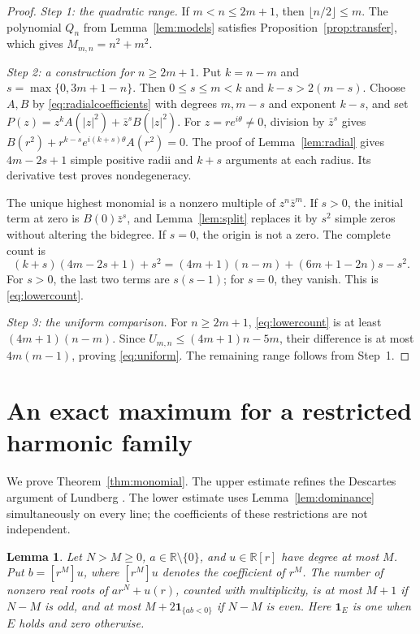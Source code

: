 \documentclass[a4paper]{amsart}
\newtheorem{lem}[thm]{Lemma}
\theoremstyle{remark}
\newcommand{\R}{\mathbb R}
\begin{document}
\begin{proof}
\emph{Step 1: the quadratic range.}
If \(m<n\le2m+1\), then \(\lfloor n/2\rfloor\le m\).
The polynomial \(Q_n\) from Lemma~\ref{lem:models}
satisfies Proposition~\ref{prop:transfer}, which gives
\(M_{m,n}=n^2+m^2\).

\emph{Step 2: a construction for \(n\ge2m+1\).}
Put \(k=n-m\) and \(s=\max\{0,3m+1-n\}\).
Then \(0\le s\le m<k\) and \(k-s>2(m-s)\).
Choose \(A,B\) by \eqref{eq:radialcoefficients} with
degrees \(m,m-s\) and exponent \(k-s\), and set
\(P(z)=z^kA(|z|^2)+\bar z^sB(|z|^2)\).
For \(z=re^{i\theta}\ne0\), division by \(\bar z^s\)
gives
\(B(r^2)+r^{k-s}e^{i(k+s)\theta}A(r^2)=0\).
The proof of Lemma~\ref{lem:radial} gives
\(4m-2s+1\) simple positive radii and \(k+s\)
arguments at each radius. Its derivative test proves
nondegeneracy.

The unique highest monomial is a nonzero multiple of
\(z^n\bar z^m\). If \(s>0\), the initial term at zero
is \(B(0)\bar z^s\), and Lemma~\ref{lem:split}
replaces it by \(s^2\) simple zeros without altering
the bidegree. If \(s=0\), the origin is not a zero.
The complete count is
\[
 (k+s)(4m-2s+1)+s^2
 =(4m+1)(n-m)+(6m+1-2n)s-s^2.
\]
For \(s>0\), the last two terms are \(s(s-1)\);
for \(s=0\), they vanish. This is \eqref{eq:lowercount}.

\emph{Step 3: the uniform comparison.}
For \(n\ge2m+1\), \eqref{eq:lowercount} is at least
\((4m+1)(n-m)\). Since
\(U_{m,n}\le(4m+1)n-5m\), their difference is
at most \(4m(m-1)\), proving \eqref{eq:uniform}.
The remaining range follows from Step~1.
\end{proof}

\section{An exact maximum for a restricted harmonic family}\label{sec:monomial}

We prove Theorem~\ref{thm:monomial}. The upper estimate
refines the Descartes argument of Lundberg
\cite[Section 4.1]{Lun23}. The lower estimate uses
Lemma~\ref{lem:dominance} simultaneously on every line;
the coefficients of these restrictions are not independent.

\begin{lem}\label{lem:gap}
Let \(N>M\ge0\), \(a\in\R\setminus\{0\}\), and
\(u\in\R[r]\) have degree at most \(M\).
Put \(b=[r^M]u\), where \([r^M]u\) denotes the coefficient
of \(r^M\).
The number of nonzero real roots of \(ar^N+u(r)\),
counted with multiplicity, is at most \(M+1\) if
\(N-M\) is odd, and at most
\(M+2\mathbf1_{\{ab<0\}}\) if \(N-M\) is even.
Here \(\mathbf1_E\) is one when \(E\) holds and zero otherwise.
\end{lem}
\end{document}
